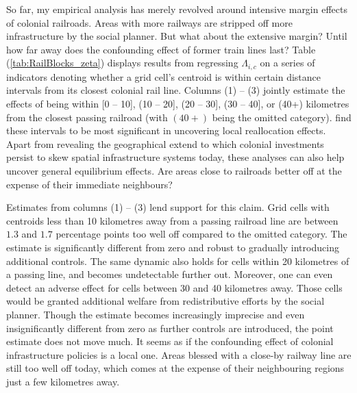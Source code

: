 \documentclass[11pt, oneside]{article}   	%
\let\oldref\ref
\renewcommand{\ref}[1]{(\oldref{#1})}
\begin{document}

So far, my empirical analysis has merely revolved around intensive margin effects of colonial railroads. Areas with more railways are stripped off more infrastructure by the social planner. But what about the extensive margin? Until how far away does the confounding effect of former train lines last? Table \ref{tab:RailBlocks_zeta} displays results from regressing $\Lambda_{i,c}$ on a series of indicators denoting whether a grid cell's centroid is within certain distance intervals from its closest colonial rail line. Columns (1) -- (3) jointly estimate the effects of being within [0 -- 10], (10 -- 20], (20 -- 30], (30 -- 40], or (40+) kilometres from the closest passing railroad (with $(40+)$ being the omitted category). \cite{jedwab_permanent_2016} find these intervals to be most significant in uncovering local reallocation effects. Apart from revealing the geographical extend to which colonial investments persist to skew spatial infrastructure systems today, these analyses can also help uncover general equilibrium effects. Are areas close to railroads better off at the expense of their immediate neighbours?

Estimates from columns (1) -- (3) lend support for this claim. Grid cells with centroids less than 10 kilometres away from a passing railroad line are between $1.3$ and $1.7$ percentage points too well off compared to the omitted category. The estimate is significantly different from zero and robust to gradually introducing additional controls. The same dynamic also holds for cells within 20 kilometres of a passing line, and becomes undetectable further out. Moreover, one can even detect an adverse effect for cells between 30 and 40 kilometres away. Those cells would be granted additional welfare from redistributive efforts by the social planner. Though the estimate becomes increasingly imprecise and even insignificantly different from zero as further controls are introduced, the point estimate does not move much. It seems as if the confounding effect of colonial infrastructure policies is a local one. Areas blessed with a close-by railway line are still too well off today, which comes at the expense of their neighbouring regions just a few kilometres away.
\end{document}
